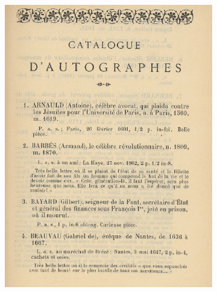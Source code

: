 \begin{figure}[h]
	\centering
	\begin{subfigure}{0.45\textwidth}
		\includegraphics[width=\textwidth]{img/CAT_000441_0.png}
	\end{subfigure}
	\begin{subfigure}{0.45\textwidth}

\end{subfigure}
\end{figure}
